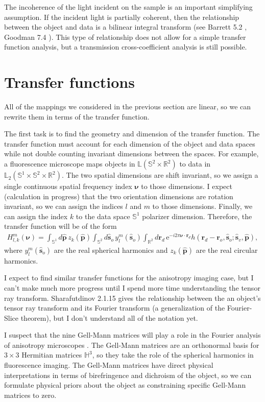 \documentclass[11pt]{article}
\newcommand{\me}{\mathrm{e}}
\providecommand{\mb}[1]{\mathbf{#1}}
\providecommand{\ro}[1]{\mathbf{\mathbf{r}}_o}
\providecommand{\so}[1]{\mathbf{\hat{s}}_o}
\providecommand{\rd}[1]{\mathbf{r}_d}
\providecommand{\mbb}[1]{\mathbb{#1}}
\providecommand{\bs}[1]{\boldsymbol{#1}}
\begin{document}
The incoherence of the light incident on the sample is an important simplifying
assumption. If the incident light is partially coherent, then the relationship
between the object and data is a bilinear integral transform (see Barrett 5.2
\cite{barrett2004}, Goodman 7.4 \cite{goodman1985}). This type of relationship
does not allow for a simple transfer function analysis, but a transmission
cross-coefficient analysis is still possible.

\section{Transfer functions}
All of the mappings we considered in the previous section are linear, so we can
rewrite them in terms of the transfer function. 

The first task is to find the geometry and dimension of the transfer function.
The transfer function must account for each dimension of the object and data
spaces while not double counting invariant dimensions between the spaces. For
example, a fluorescence microscope maps objects in
$\mbb{L}(\mbb{S}^2\times\mbb{R}^2)$ to data in
$\mbb{L}_2(\mbb{S}^1\times\mbb{S}^2\times\mbb{R}^2)$. The two spatial dimensions
are shift invariant, so we assign a single continuous spatial frequency index
$\bs{\nu}$ to those dimensions. I expect (calculation in progress) that the two
orientation dimensions are rotation invariant, so we can assign the indices $l$
and $m$ to those dimensions. Finally, we can assign the index $k$ to the data
space $\mbb{S}^1$ polarizer dimension. Therefore, the transfer function will be
of the form
\begin{align}
  H_{l,k}^{m}(\bs{\nu}) = \int_{\mbb{S}^1}d\hat{\mb{p}}\, z_k(\hat{\mb{p}}) \int_{\mbb{S}^2}d\so{}\, y_l^m(\so{})\int_{\mbb{R}^2}d\rd{}\, \me^{-i2\pi\bs{\nu}\cdot\rd{}} h(\rd{} -\ro{}, \so{}; \hat{\mb{s}}_v, \hat{\mb{p}}),
\end{align}
where $y_l^m(\so{})$ are the real spherical harmonics and $z_k(\hat{\mb{p}})$
are the real circular harmonics.

I expect to find similar transfer functions for the anisotropy imaging case,
but I can't make much more progress until I spend more time understanding the
tensor ray transform. Sharafutdinov 2.1.15 \cite{shara1994} gives the
relationship between the an object's tensor ray transform and its Fourier
transform (a generalization of the Fourier-Slice theorem), but I don't
understand all of the notation yet.

I suspect that the nine Gell-Mann matrices will play a role in the Fourier
analysis of anisotropy microscopes \cite{ortega13}. The Gell-Mann matrices are
an orthonormal basis for $3\times 3$ Hermitian matrices $\mbb{H}^3$, so they
take the role of the spherical harmonics in fluorescence imaging. The Gell-Mann
matrices have direct physical interpretations in terms of birefringence and
dichroism of the object, so we can formulate physical priors about the object as
constraining specific Gell-Mann matrices to zero.

{}

\end{document}
